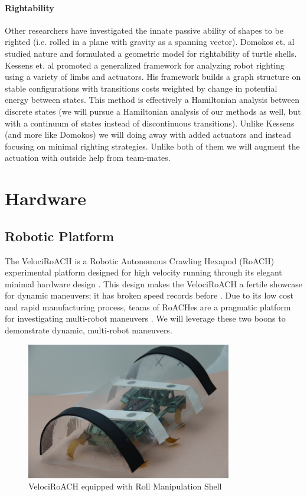 \documentclass[letterpaper]{report}
\begin{document}
\subsubsection{Rightability}
Other researchers have investigated the innate passive ability of shapes to be righted (i.e. rolled in a plane with gravity as a spanning vector).
Domokos et. al \cite{domokos2008geometry} studied nature and formulated a geometric model for rightability of turtle shells.
Kessens et. al \cite{kessens2012framework,kessens2014metric} promoted a generalized framework for analyzing robot righting using a variety of limbs and actuators.
His framework builds a graph structure on stable configurations with transitions costs weighted by change in potential energy between states.
This method is effectively a Hamiltonian analysis between discrete states (we will pursue a Hamiltonian analysis of our methods as well, but with a continuum of states instead of discontinuous transitions).
Unlike Kessens (and more like Domokos) we will doing away with added actuators and instead focusing on minimal righting strategies.
Unlike both of them we will augment the actuation with outside help from team-mates.

\chapter{Hardware}

\section{Robotic Platform}
The VelociRoACH is a Robotic Autonomous Crawling Hexapod (RoACH) experimental platform designed for high velocity running through its elegant minimal hardware design \cite{haldaneVelociRoACHDesign}.
This design makes the VelociRoACH a fertile showcase for dynamic maneuvers; it has broken speed records before \cite{haldane2015running}.
Due to its low cost and rapid manufacturing process, teams of RoACHes are a pragmatic platform for investigating multi-robot maneuvers \cite{casarez2016step}.
We will leverage these two boons to demonstrate dynamic, multi-robot maneuvers.

\begin{figure}[ht]
  \centering
  \includegraphics[width=0.8\textwidth]{ShellRoACH.jpg}
  \caption{\label{fig:ShellRoACH}VelociRoACH equipped with Roll Manipulation Shell}
\end{figure}
\end{document}
